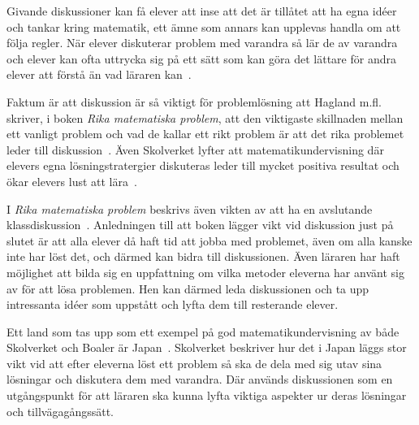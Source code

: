 \textcolor{turkos} {
Givande diskussioner kan få elever att inse att det är tillåtet att ha egna idéer och tankar kring matematik, ett ämne som annars kan upplevas handla om att följa regler. När elever diskuterar problem med varandra så lär de av varandra och elever kan ofta uttrycka sig på ett sätt som kan göra det lättare för andra elever att förstå än vad läraren kan~\cite{TheElephant}.
}

\textcolor{turkos} {Faktum är att diskussion är så viktigt för problemlösning att Hagland m.fl. skriver, i boken \textit{Rika matematiska problem}, att den viktigaste skillnaden mellan ett vanligt problem och vad de kallar ett rikt problem är att det rika problemet leder till diskussion~\cite{RikaProblem}. Även Skolverket lyfter att matematikundervisning där elevers egna lösningstratergier diskuteras leder till mycket positiva resultat och ökar elevers lust att lära~\cite{Skolverket03}.}

\textcolor{turkos}{I \textit{Rika matematiska problem} beskrivs även vikten av att ha en avslutande klassdiskussion~\cite{RikaProblem}. Anledningen till att boken lägger vikt vid diskussion just på slutet är att alla elever då haft tid att jobba med problemet, även om alla kanske inte har löst det, och därmed kan bidra till diskussionen. Även läraren har haft möjlighet att bilda sig en uppfattning om vilka metoder eleverna har använt sig av för att lösa problemen. Hen kan därmed leda diskussionen och ta upp intressanta idéer som uppstått och lyfta dem till resterande elever.}

\textcolor{turkos} {
Ett land som tas upp som ett exempel på god matematikundervisning av både Skolverket och Boaler är Japan~\cite{TheElephant}\cite{Skolverket03}. Skolverket beskriver hur det i Japan läggs stor vikt vid att efter eleverna löst ett problem så ska de dela med sig utav sina lösningar och diskutera dem med varandra. Där används diskussionen som en utgångspunkt för att läraren ska kunna lyfta viktiga aspekter ur deras lösningar och tillvägagångssätt.}







